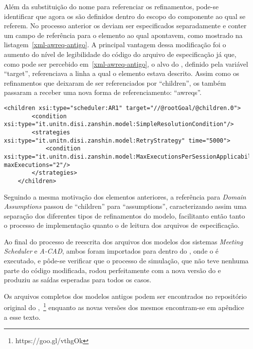 Além da substituição do nome para referenciar os refinamentos, pode-se identificar que agora os \awreqs são definidos dentro do escopo do componente ao qual se referem. No processo anterior os \awreqs deviam ser especificados separadamente e conter um campo de referência para o elemento ao qual apontavem, como mostrado na listagem~\ref{xml-awreq-antigo}. A principal vantagem dessa modificação foi o aumento do nível de legibilidade do código do arquivo de especificação já que, como pode ser percebido em~\ref{xml-awreq-antigo}, o alvo do \awreq, definido pela variável ``target'', referenciava a linha a qual o elemento estava descrito. Assim como os refinamentos que deixaram de ser referenciados por ``children'', os \awreqs também passaram a receber uma nova forma de referenciamento: ``awreqs''.
 
\begin{lstlisting}[caption={Trecho de XML representando o ACAD no novo metamodelo},label={xml-awreq-antigo}]
	<children xsi:type="scheduler:AR1" target="//@rootGoal/@children.0">
		<condition xsi:type="it.unitn.disi.zanshin.model:SimpleResolutionCondition"/>
		<strategies xsi:type="it.unitn.disi.zanshin.model:RetryStrategy" time="5000">
			<condition xsi:type="it.unitn.disi.zanshin.model:MaxExecutionsPerSessionApplicabilityCondition" maxExecutions="2"/>
		</strategies>
	</children>
\end{lstlisting}


Seguindo a mesma motivação dos elementos anteriores, a referência para \textit{Domain Assumptions} passou de ``children'' para ``assumptions'', caracterizando assim uma separação dos diferentes tipos de refinamentos do modelo, facilitanto então tanto o processo de implementação quanto o de leitura dos arquivos de especificação. 

Ao final do processo de reescrita dos arquivos dos modelos dos sistemas \textit{Meeting Scheduler} e \textit{A-CAD}, ambos foram importados para dentro do \eclipse, onde o \zanshin é executado, e pôde-se verificar que o processo de simulação, que não teve nenhuma parte do código modificada, rodou perfeitamente com a nova versão do \zanshin e produziu as saídas esperadas para todos os casos.

Os arquivos completos dos modelos antigos podem ser encontrados no repositório original do \framework,~\footnote{https://goo.gl/vthgOk} enquanto as novas versões dos mesmos encontram-se em apêndice a esse texto.

